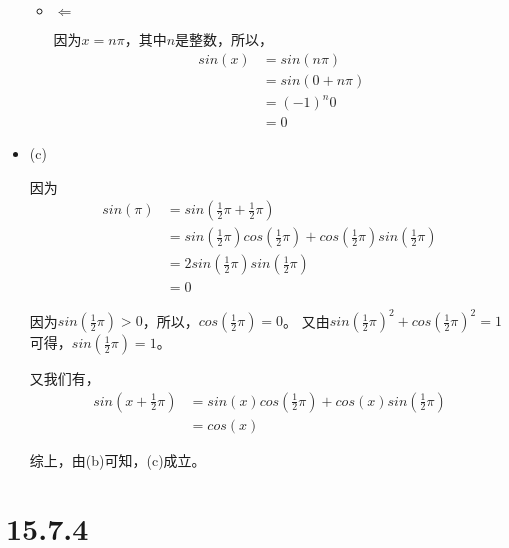 \documentclass{article}
\begin{document}
\begin{itemize}
\begin{itemize}
          \item $\Leftarrow$

                因为$x = n\pi$，其中$n$是整数，所以，
                \begin{align*}
                  sin(x) & = sin(n\pi)     \\
                         & = sin(0 + n\pi) \\
                         & = (-1)^{n} 0    \\
                         & = 0
                \end{align*}
        \end{itemize}
  \item (c)

        因为
        \begin{align*}
          sin(\pi) & = sin(\frac{1}{2}\pi + \frac{1}{2}\pi)                                            \\
                   & = sin(\frac{1}{2}\pi)cos(\frac{1}{2}\pi) + cos(\frac{1}{2}\pi)sin(\frac{1}{2}\pi) \\
                   & = 2sin(\frac{1}{2}\pi)sin(\frac{1}{2}\pi)                                         \\
                   & = 0
        \end{align*}

        因为$sin(\frac{1}{2}\pi) > 0$，所以，$cos(\frac{1}{2}\pi) = 0$。
        又由$sin(\frac{1}{2}\pi)^2 + cos(\frac{1}{2}\pi)^2 = 1$可得，$sin(\frac{1}{2}\pi) = 1$。

        又我们有，
        \begin{align*}
          sin(x + \frac{1}{2}\pi) & = sin(x)cos(\frac{1}{2}\pi) + cos(x)sin(\frac{1}{2}\pi) \\
                                  & = cos(x)
        \end{align*}

        综上，由(b)可知，(c)成立。

\end{itemize}

\section*{15.7.4}
\end{document}
